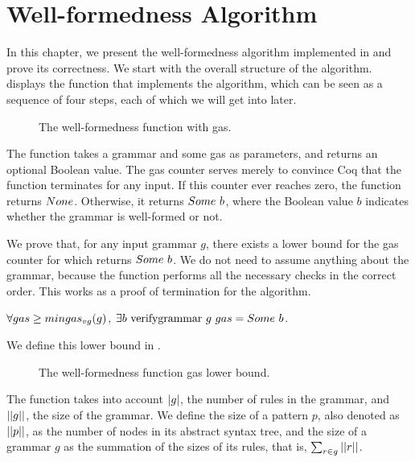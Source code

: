 \chapter{Well-formedness Algorithm}
\label{chapter:wf-algorithm}

In this chapter,
we present the well-formedness algorithm
implemented in \lpeg{}
and prove its correctness.
We start with the overall structure
of the algorithm.
displays the function that implements the algorithm,
which can be seen as a sequence of four steps,
each of which we will get into later.
\begin{figure}
    \centering
    
    \caption{The well-formedness function with gas.}
    \label{fig:verifygrammar-function}
\end{figure}
The function \textit{\verifygrammarname{}}
takes a grammar and some gas as parameters,
and returns an optional Boolean value.
The gas counter serves merely to convince Coq
that the function terminates for any input.
If this counter ever reaches zero,
the function returns $None$.
Otherwise, it returns $Some\ b$,
where the Boolean value $b$
indicates whether the grammar
is well-formed or not.

We prove that,
for any input grammar $g$,
there exists a lower bound for the gas counter
for which \textit{\verifygrammarname{}} returns $Some\ b$.
We do not need to assume anything
about the grammar, because the function
performs all the necessary checks
in the correct order.
This works as a proof of termination
for the algorithm.
\begin{lemma}
    \label{lemma:verifygrammar-termination}
    $\forall gas \ge mingas_{vg}(g)$,
    $\exists b\ \text{verifygrammar{}}\ g\ gas = Some\ b$.
\end{lemma}

We define this lower bound
in .
\begin{figure}
    \centering
    
    \caption{The well-formedness function gas lower bound.}
    \label{fig:verifygrammargas}
\end{figure}
The function takes into account
$|g|$, the number of rules in the grammar,
and $||g||$, the size of the grammar.
We define the size of a pattern $p$, also denoted as $||p||$,
as the number of nodes in its abstract syntax tree,
and the size of a grammar $g$
as the summation of the sizes of its rules,
that is, $\sum_{r \in g} ||r||$.

